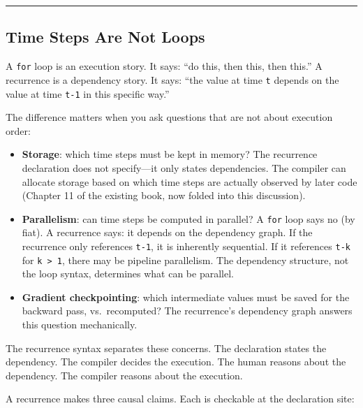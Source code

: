 \documentclass[11pt,]{article}
\begin{document}
\begin{center}\rule{0.5\linewidth}{0.4pt}\end{center}

\hypertarget{time-steps-are-not-loops}{%
\subsection{Time Steps Are Not Loops}\label{time-steps-are-not-loops}}

A \texttt{for} loop is an execution story. It says: ``do this, then
this, then this.'' A recurrence is a dependency story. It says: ``the
value at time \texttt{t} depends on the value at time \texttt{t-1} in
this specific way.''

The difference matters when you ask questions that are not about
execution order:

\begin{itemize}
\item
  \textbf{Storage}: which time steps must be kept in memory? The
  recurrence declaration does not specify---it only states dependencies.
  The compiler can allocate storage based on which time steps are
  actually observed by later code (Chapter 11 of the existing book, now
  folded into this discussion).
\item
  \textbf{Parallelism}: can time steps be computed in parallel? A
  \texttt{for} loop says no (by fiat). A recurrence says: it depends on
  the dependency graph. If the recurrence only references \texttt{t-1},
  it is inherently sequential. If it references \texttt{t-k} for
  \texttt{k\ \textgreater{}\ 1}, there may be pipeline parallelism. The
  dependency structure, not the loop syntax, determines what can be
  parallel.
\item
  \textbf{Gradient checkpointing}: which intermediate values must be
  saved for the backward pass, vs.~recomputed? The recurrence's
  dependency graph answers this question mechanically.
\end{itemize}

The recurrence syntax separates these concerns. The declaration states
the dependency. The compiler decides the execution. The human reasons
about the dependency. The compiler reasons about the execution.

A recurrence makes three causal claims. Each is checkable at the
declaration site:
\end{document}
